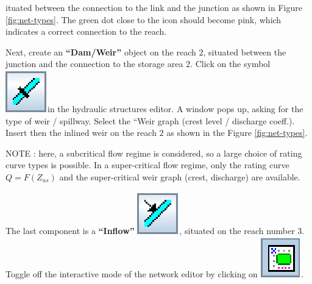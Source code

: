 \documentclass[a4paper,12pt]{article}
\begin{document}
ituated between the connection to the link and the junction as
shown in Figure \ref{fig:net-types}. The green dot close to the icon
should become pink, which indicates a correct connection to the reach.

\vspace{0.5cm}

Next, create an \textbf{{}``Dam/Weir''} object on the reach
$2$, situated between the junction and the connection to the storage
area $2$. Click on the symbol \includegraphics[scale=0.6]{dam_weir}in
the hydraulic structures editor. A window pops up, asking for the
type of weir / spillway. Select the {}``Weir graph (crest level /
discharge coeff.). Insert then the inlined weir on the reach $2$ as
shown in the Figure \ref{fig:net-types}. 

\vspace{0.5cm}

NOTE : here, a subcritical flow regime is considered, so a large choice
of rating curve types is possible. In a super-critical flow regime,
only the rating curve $Q=F(Z_{us})$ and the super-critical weir graph (crest,
discharge) are available.

\vspace{0.5cm}

The last component is a \textbf{{}``Inflow''} \includegraphics[scale=0.6]{inflow},
situated on the reach number $3$. Toggle off the interactive mode of
the network editor by clicking on \includegraphics[scale=0.6]{edit_nw}.

\newpage
\end{document}
